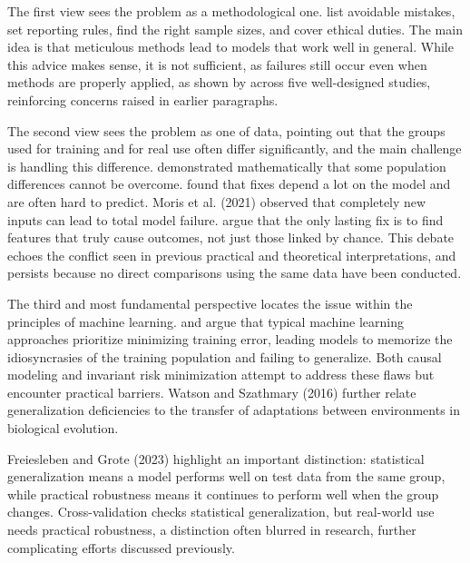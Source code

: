The first view sees the problem as a methodological one. \cite{whalen2022pitfalls} list avoidable mistakes, \cite{collins2024tripod} set reporting rules, \cite{riley2021sample} find the right sample sizes, and \cite{vayena2018ethics} cover ethical duties. The main idea is that meticulous methods lead to models that work well in general. While this advice makes sense, it is not sufficient, as failures still occur even when methods are properly applied, as shown by \cite{chekroud2024illusory} across five well-designed studies, reinforcing concerns raised in earlier paragraphs.

The second view sees the problem as one of data, pointing out that the groups used for training and for real use often differ significantly, and the main challenge is handling this difference. \cite{bendavid2010theory} demonstrated mathematically that some population differences cannot be overcome. \cite{worheide2021shift} found that fixes depend a lot on the model and are often hard to predict. Moris et al. (2021) \cite{springer2021unseen} observed that completely new inputs can lead to total model failure. \cite{subbaswamy2020shift} argue that the only lasting fix is to find features that truly cause outcomes, not just those linked by chance. This debate echoes the conflict seen in previous practical and theoretical interpretations, and persists because no direct comparisons using the same data have been conducted.

The third and most fundamental perspective locates the issue within the principles of machine learning. \cite{arjovsky2020irm} and \cite{pavlovic2024causal} argue that typical machine learning approaches prioritize minimizing training error, leading models to memorize the idiosyncrasies of the training population and failing to generalize. Both causal modeling and invariant risk minimization attempt to address these flaws but encounter practical barriers. Watson and Szathmary (2016) \cite{watson2017evolution} further relate generalization deficiencies to the transfer of adaptations between environments in biological evolution.

Freiesleben and Grote (2023) \cite{sullivan2023robustness} highlight an important distinction: statistical generalization means a model performs well on test data from the same group, while practical robustness means it continues to perform well when the group changes. Cross-validation checks statistical generalization, but real-world use needs practical robustness, a distinction often blurred in research, further complicating efforts discussed previously.

